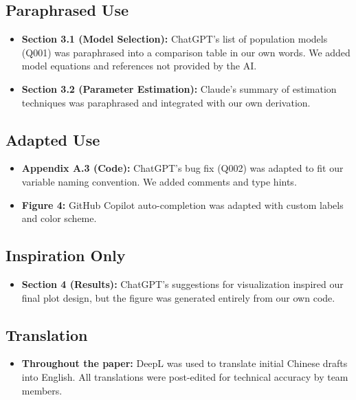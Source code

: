 \documentclass[12pt, a4paper]{article}
\begin{document}
\subsection{Paraphrased Use}
\begin{itemize}
    \item \textbf{Section 3.1 (Model Selection):} ChatGPT's list of
    population models (Q001) was paraphrased into a comparison table
    in our own words. We added model equations and references not
    provided by the AI.
    \item \textbf{Section 3.2 (Parameter Estimation):} Claude's
    summary of estimation techniques was paraphrased and integrated
    with our own derivation.
\end{itemize}

\subsection{Adapted Use}
\begin{itemize}
    \item \textbf{Appendix A.3 (Code):} ChatGPT's bug fix (Q002) was
    adapted to fit our variable naming convention. We added comments
    and type hints.
    \item \textbf{Figure 4:} GitHub Copilot auto-completion was
    adapted with custom labels and color scheme.
\end{itemize}

\subsection{Inspiration Only}
\begin{itemize}
    \item \textbf{Section 4 (Results):} ChatGPT's suggestions for
    visualization inspired our final plot design, but the figure was
    generated entirely from our own code.
\end{itemize}

\subsection{Translation}
\begin{itemize}
    \item \textbf{Throughout the paper:} DeepL was used to translate
    initial Chinese drafts into English. All translations were
    post-edited for technical accuracy by team members.
\end{itemize}
\end{document}
